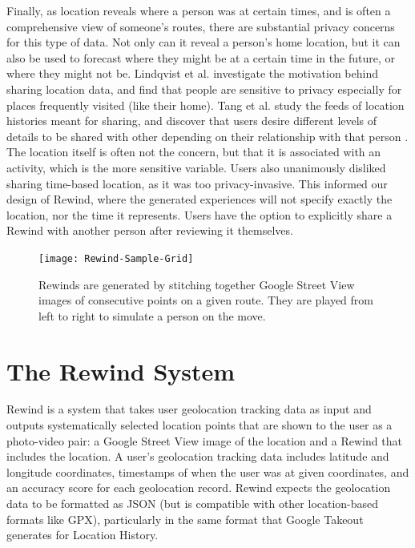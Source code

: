 \documentclass{sigchi}
\begin{document}
Finally, as location reveals where a person was at certain times, and is often a comprehensive view of someone's routes, there are substantial privacy concerns for this type of data. Not only can it reveal a person's home location, but it can also be used to forecast where they might be at a certain time in the future, or where they might not be. Lindqvist et al. \cite{lindqvist2011m} investigate the motivation behind sharing location data, and find that people are sensitive to privacy especially for places frequently visited (like their home). Tang et al. study the feeds of location histories meant for sharing, and discover that users desire different levels of details to be shared with other depending on their relationship with that person \cite{tang2011understanding}. The location itself is often not the concern, but that it is associated with an activity, which is the more sensitive variable. Users also unanimously disliked sharing time-based location, as it was too privacy-invasive. This informed our design of Rewind, where the generated experiences will not specify exactly the location, nor the time it represents. Users have the option to explicitly share a Rewind with another person after reviewing it themselves.

\begin{figure}[h]
   \centering
     \texttt{[image: Rewind-Sample-Grid]}
     \caption{Rewinds are generated by stitching together Google Street View images of consecutive points on a given route. They are played from left to right to simulate a person on the move.}
     \label{fig:rewinds}
\end{figure}

\section{The Rewind System}
Rewind is a system that takes user geolocation tracking data as input and outputs systematically selected location points that are shown to the user as a photo-video pair: a Google Street View image of the location and a Rewind that includes the location. A user's geolocation tracking data includes latitude and longitude coordinates, timestamps of when the user was at given coordinates, and an accuracy score for each geolocation record. Rewind expects the geolocation data to be formatted as JSON (but is compatible with other location-based formats like GPX), particularly in the same format that Google Takeout generates for Location History.
\end{document}
